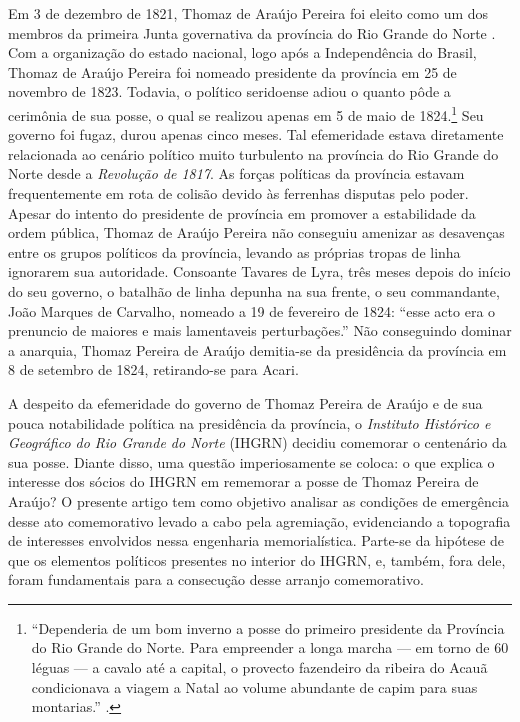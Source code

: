 \begin{refsection}
    Em 3 de dezembro de 1821, Thomaz de Araújo Pereira foi eleito como um dos membros da primeira Junta governativa da província do Rio Grande do Norte \cite[p.~224]{Lyra1907Notas}. Com a organização do estado nacional, logo após a Independência do Brasil, Thomaz de Araújo Pereira foi nomeado presidente da província em 25 de novembro de 1823. Todavia, o político seridoense adiou o quanto pôde a cerimônia de sua posse, o qual se realizou apenas em 5 de maio de 1824.\footnote{``Dependeria de um bom inverno a posse do primeiro presidente da Província do Rio Grande do Norte. Para empreender a longa marcha --- em torno de 60 léguas --- a cavalo até a capital, o provecto fazendeiro da ribeira do Acauã condicionava a viagem a Natal ao volume abundante de capim para suas montarias.'' \cite[p.~51]{Macedo2012Penultima}.} Seu governo foi fugaz, durou apenas cinco meses. Tal efemeridade estava diretamente relacionada ao cenário político muito turbulento na província do Rio Grande do Norte desde a \textit{Revolução de 1817}. As forças políticas da província estavam frequentemente em rota de colisão devido às ferrenhas disputas pelo poder. Apesar do intento do presidente de província em promover a estabilidade da ordem pública, Thomaz de Araújo Pereira não conseguiu amenizar as desavenças entre os grupos políticos da província, levando as próprias tropas de linha ignorarem sua autoridade. Consoante Tavares de Lyra, três meses depois do início do seu governo, o batalhão de linha depunha na sua frente, o seu commandante, João Marques de Carvalho, nomeado a 19 de fevereiro de 1824: ``esse acto era o prenuncio de maiores e mais lamentaveis perturbações.'' \cite[p.~240]{Lyra1907Notas} Não conseguindo dominar a anarquia, Thomaz Pereira de Araújo demitia-se da presidência da província em 8 de setembro de 1824, retirando-se para Acari. \cite[p.~240]{Lyra1907Notas}

    A despeito da efemeridade do governo de Thomaz Pereira de Araújo e de sua pouca notabilidade política na presidência da província, o \textit{Instituto Histórico e Geográfico do Rio Grande do Norte} (IHGRN) decidiu comemorar o centenário da sua posse. Diante disso, uma questão imperiosamente se coloca: o que explica o interesse dos sócios do IHGRN em rememorar a posse de Thomaz Pereira de Araújo? O presente artigo tem como objetivo analisar as condições de emergência desse ato comemorativo levado a cabo pela agremiação, evidenciando a topografia de interesses envolvidos nessa engenharia memorialística. Parte-se da hipótese de que os elementos políticos presentes no interior do IHGRN, e, também, fora dele, foram fundamentais para a consecução desse arranjo comemorativo.
    

\end{refsection}

